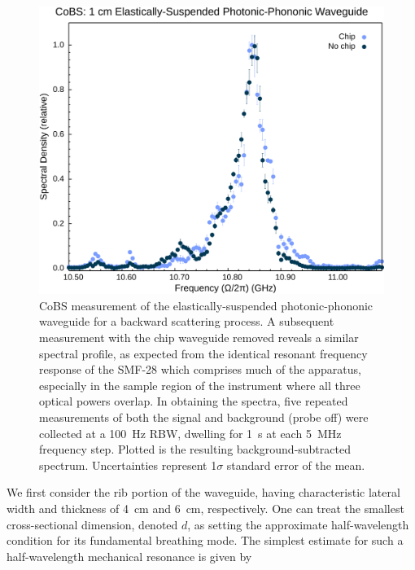 \begin{figure}[t]
  \centering
  \hspace{-2em}\includegraphics[width=.85\textwidth]{figs/4-Raman/CoBS: 1 cm Elastically-Suspended Photonic-Phononic Waveguide.png}
  \caption[\ac{CoBS} measurement of the elastically-suspended photonic-phononic waveguide for a backward scattering process.]{\ac{CoBS} measurement of the elastically-suspended photonic-phononic waveguide for a backward scattering process. A subsequent measurement with the chip waveguide removed reveals a similar spectral profile, as expected from the identical resonant frequency response of the \ac{SMF-28} which comprises much of the apparatus, especially in the sample region of the instrument where all three optical powers overlap. In obtaining the spectra, five repeated measurements of both the signal and background (probe off) were collected at a \SI{100}{\hertz} \ac{RBW}, dwelling for \SI{1}{\second} at each \SI{5}{\mega\hertz} frequency step. Plotted is the resulting background-subtracted spectrum. Uncertainties represent 1\(\sigma\) standard error of the mean.}
  \label{fig:Raman:wigglyCoBSspectra}
\end{figure}

We first consider the rib portion of the waveguide, having characteristic lateral width and thickness of \SI{4}{\centi\meter} and \SI{6}{\centi\meter}, respectively. One can treat the smallest cross-sectional dimension, denoted \(d\), as setting the approximate half-wavelength condition for its fundamental breathing mode. The simplest estimate for such a half-wavelength mechanical resonance is given by

